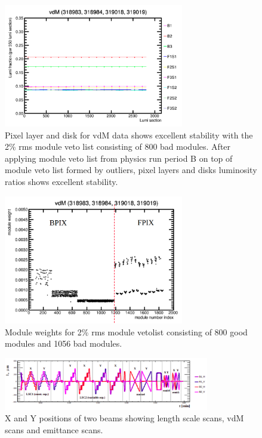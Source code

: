 \begin{figure}[!htp]
\centering
\includegraphics[width=0.7\textwidth]{ashish_thesis/vdm_stability.png}
\caption{%
   Pixel layer and disk for vdM data shows excellent stability with the 2\% rms module veto list consisting of 800 bad modules. After applying module veto list from physics run period B on top of module veto list formed by outliers, pixel layers and disks luminosity ratios shows excellent stability.
}
\label{fig:vdm_stability}
\end{figure}


\begin{figure}[!htp]
\centering
\includegraphics[width=0.7\textwidth]{ashish_thesis/module_weights_per_period_veto.png}
\caption{%
   Module weights for 2\% rms module vetolist consisting of 800 good modules and 1056 bad modules.
}
\label{fig:mod_weight_new_veto}
\end{figure}


\begin{figure}[!htp]
\centering
\includegraphics[width=0.8\textwidth]{ashish_thesis/vdm_beam_position.png}
\caption{%
   X and Y positions of two beams showing length scale scans, vdM scans and emittance scans.
}
\label{fig:beam_plot_vdm}
\end{figure}


